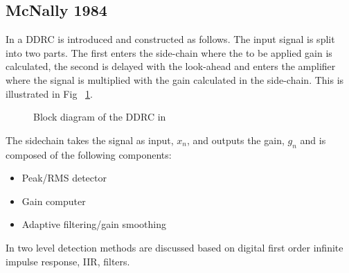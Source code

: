 \documentclass[../main2.tex]{subfiles}
\providecommand{\rootdir}{..}
\begin{document}
\subsection{McNally 1984}
In \cite{mcnally1984dynamic} a DDRC is introduced and constructed as follows. The input signal is split into two parts. The first enters the side-chain where the to be applied gain is calculated, the second is delayed with the look-ahead and enters the amplifier where the signal is multiplied with the gain calculated in the side-chain. This is illustrated in Fig ~\ref{fig:block_mcnally_theory1}. %
\begin{figure}
\centerline{}
\caption{Block diagram of the DDRC in \cite{mcnally1984dynamic}}
\label{fig:block_mcnally_theory1}
\end{figure}

The sidechain takes the signal as input, $x_n$, and outputs the gain, $g_n$ and is composed of the following components:%
\begin{itemize}
\item{Peak/RMS detector}
\item{Gain computer}
\item{Adaptive filtering/gain smoothing}
\end{itemize}
In \cite{mcnally1984dynamic} two level detection methods are discussed based on digital first order infinite impulse response, IIR, filters.
\end{document}
